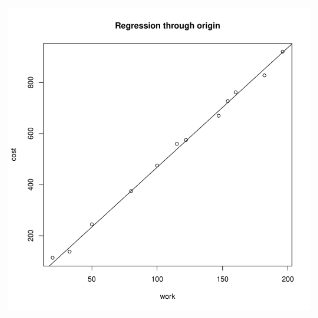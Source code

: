 \documentclass{article}\usepackage[]{graphicx}\usepackage[]{color}
\newenvironment{knitrout}{}{} %
\begin{document}
\begin{knitrout}
\includegraphics[width=0.6\textwidth]{figure/unnamed-chunk-4-1} 

\end{knitrout}
\end{document}
